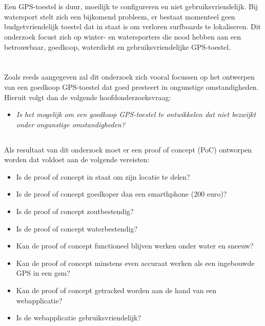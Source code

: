\section{}
\label{sec:probleemstelling}

 Een GPS-toestel is duur, moeilijk te configureren en niet gebruiksvriendelijk. Bij watersport stelt zich een bijkomend probleem, er bestaat momenteel geen budgetvriendelijk toestel dat in staat is om verloren surfboards te lokaliseren. Dit onderzoek focust zich op winter- en watersporters die nood hebben aan een betrouwbaar, goedkoop, waterdicht en gebruiksvriendelijke GPS-toestel.

\section{}
\subsection{}
\label{sec:onderzoeksvraag}

Zoals reeds aangegeven zal dit onderzoek zich vooral focussen op het ontwerpen van een goedkoop GPS-toestel dat goed presteert in ongunstige omstandigheden. Hieruit volgt dan de volgende hoofdonderzoeksvraag:
\newline
\begin{itemize}
	\item[] \textit{Is het mogelijk om een goedkoop GPS-toestel te ontwikkelen dat niet bezwijkt onder ongunstige omstandigheden?}
\end{itemize}

\subsection{}
Als resultaat van dit onderzoek moet er een proof of concept (PoC) ontworpen worden dat voldoet aan de volgende vereisten:
\begin{itemize}
	\item Is de proof of concept in staat om zijn locatie te delen?
	\item Is de proof of concept goedkoper dan een smarthphone (200 euro)?
	\item Is de proof of concept zoutbestendig?
	\item  Is de proof of concept waterbestendig?
    \item Kan de proof of concept functioneel blijven werken  onder water en sneeuw?
	\item Kan de proof of concept minstens even accuraat werken als een ingebouwde GPS in een gsm?
	\item Kan de proof of concept getracked worden aan de hand van een webapplicatie?
	\item Is de webapplicatie gebruiksvriendelijk?
\end{itemize}

